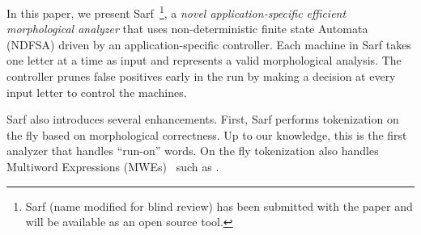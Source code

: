 \documentclass[11pt]{article}
\newcommand{\noVocRL}[1]{\transtrue\novocalize\RL{#1}\vocalize}
\begin{document}
In this paper, we present Sarf~\footnote{Sarf (name modified for blind review) 
has been submitted with the paper and will be available 
as an open source tool.}, 
a {\em novel application-specific efficient 
morphological analyzer} that uses 
non-deterministic finite state Automata (NDFSA)
driven by an application-specific controller.
Each machine in Sarf takes one letter at a time as input
and represents a valid morphological analysis.
The controller prunes false positives
early in the run by making a decision at every input letter
to control the machines.

Sarf %
also  
introduces 
several enhancements. %
First,
Sarf %
performs tokenization on the fly based on morphological correctness.
Up to our knowledge, this is the first %
analyzer that 
handles %
``run-on'' words. 
%
On the fly tokenization also handles
Multiword Expressions (MWEs)~\cite{MWE} such as \noVocRL{`bid alkarym}.
\end{document}
